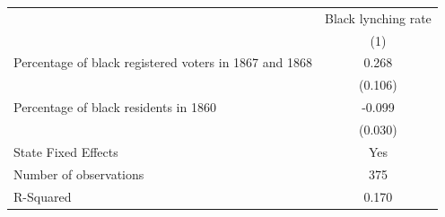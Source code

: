 {
\def\sym#1{\ifmmode^{#1}\else\(^{#1}\)\fi}
\begin{tabular}{l*{1}{c}}
\hline\hline
                    &\multicolumn{1}{c}{Black lynching rate}\\
                    &         (1)\\
\hline
Percentage of black registered voters in 1867 and 1868&       0.268\\
                    &     (0.106)\\
Percentage of black residents in 1860&      -0.099\\
                    &     (0.030)\\
State Fixed Effects &         Yes\\
\hline
Number of observations&         375\\
R-Squared           &       0.170\\
\hline\hline
\end{tabular}
}
